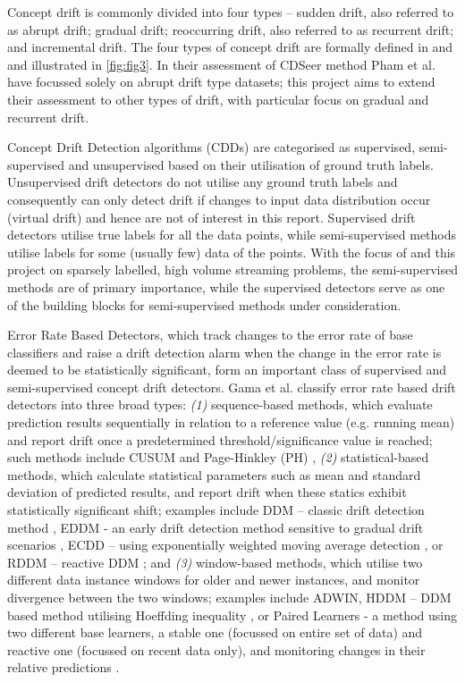 \documentclass{svproc}
\begin{document}
Concept drift is commonly divided into four types – sudden drift, also referred to as abrupt drift; gradual drift; reoccurring drift, also referred to as recurrent drift; and incremental drift. The four types of concept drift are formally defined in \cite{gama2014} and \cite{lu2018} and illustrated in \ref{fig:fig3}. In their assessment of CDSeer method Pham et al. \cite{pham2025} have focussed solely on abrupt drift type datasets; this project aims to extend their assessment to other types of drift, with particular focus on gradual and recurrent drift.

Concept Drift Detection algorithms (CDDs) are categorised as supervised, semi-supervised and unsupervised based on their utilisation of ground truth labels. Unsupervised drift detectors do not utilise any ground truth labels and consequently can only detect drift if changes to input data distribution occur (virtual drift) and hence are not of interest in this report. Supervised drift detectors utilise true labels for all the data points, while semi-supervised methods utilise labels for some (usually few) data of the points. With the focus of \cite{pham2025} and this project on sparsely labelled, high volume streaming problems, the semi-supervised methods are of primary importance, while the supervised detectors serve as one of the building blocks for semi-supervised methods under consideration. 

Error Rate Based Detectors, which track changes to the error rate of base classifiers and raise a drift detection alarm when the change in the error rate is deemed to be statistically significant, form an important class of supervised and semi-supervised concept drift detectors. Gama et al. \cite{gama2014} classify error rate based drift detectors into three broad types: \textit{(1)} sequence-based methods, which evaluate prediction results sequentially in relation to a reference value (e.g. running mean) and report drift once a predetermined threshold/significance value is reached; such methods include CUSUM and Page-Hinkley (PH) \cite{sebastiao2017}, \textit{(2)} statistical-based methods, which calculate statistical parameters such as mean and standard deviation of predicted results, and report drift when these statics exhibit statistically significant shift; examples include DDM – classic drift detection method \cite{gama2004}, EDDM - an early drift detection method sensitive to gradual drift scenarios  \cite{baena2006}, ECDD – using exponentially weighted moving average detection \cite{ross2012}, or RDDM – reactive DDM \cite{barros2017}; and \textit{(3)} window-based methods, which utilise two different data instance windows for older and newer instances, and monitor divergence between the two windows; examples include ADWIN, HDDM – DDM based method utilising Hoeffding inequality \cite{frias2014}, or  Paired Learners  - a method using two different base learners, a stable one (focussed on entire set of data) and reactive one (focussed on recent data only), and monitoring changes in their relative predictions \cite{bach2008}. 
\end{document}
